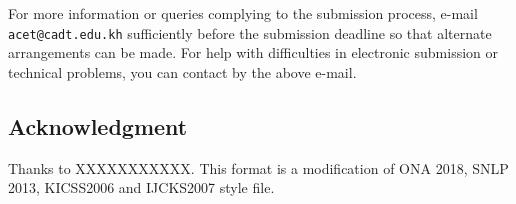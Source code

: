 \documentclass[11pt,a4paper]{article}
\begin{document}
For more information or queries complying to the submission process,
e-mail {\tt acet@cadt.edu.kh} sufficiently before the submission
deadline so that alternate arrangements can be made.  For help with
difficulties in electronic submission or technical problems, you can
contact by the above e-mail.

\subsection*{Acknowledgment}

Thanks to XXXXXXXXXXX.  This format is a modification of ONA 2018, SNLP 2013, KICSS2006 
and IJCKS2007 style file.




\end{document}
